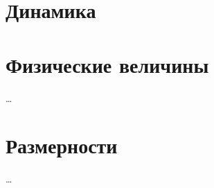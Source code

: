 \documentclass[a4paper, 12pt]{article}
\begin{document}
        \section[Дин.]{Динамика}
    \newpage
    \appendix %
    \section{Физические величины} %
        \dots
    \section{Размерности} %
        \dots
\end{document}
